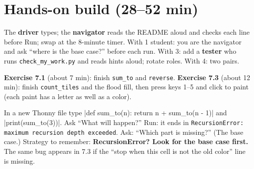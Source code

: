 \section{Hands-on build (28--52 min)}
\begin{pairroles}
The \textbf{driver} types; the \textbf{navigator} reads the README aloud and checks each line before Run; swap at the 8-minute timer. With 1 student: you are the navigator and ask \enquote{where is the base case?} before each run. With 3: add a \textbf{tester} who runs \texttt{check\_my\_work.py} and reads hints aloud; rotate roles. With 4: two pairs.
\end{pairroles}

\textbf{Exercise 7.1} (about 7 min): finish \texttt{sum\_to} and \texttt{reverse}. \textbf{Exercise 7.3} (about 12 min): finish \texttt{count\_tiles} and the flood fill, then press keys 1--5 and click to paint (each paint has a letter as well as a color).

\begin{bughunt}
In a new Thonny file type \py|def sum_to(n): return n + sum_to(n - 1)| and \py|print(sum_to(3))|. Ask \enquote{What will happen?} Run: it ends in \texttt{RecursionError: maximum recursion depth exceeded}. Ask: \enquote{Which part is missing?} (The base case.) Strategy to remember: \textbf{RecursionError? Look for the base case first.} The same bug appears in 7.3 if the \enquote{stop when this cell is not the old color} line is missing.
\end{bughunt}

